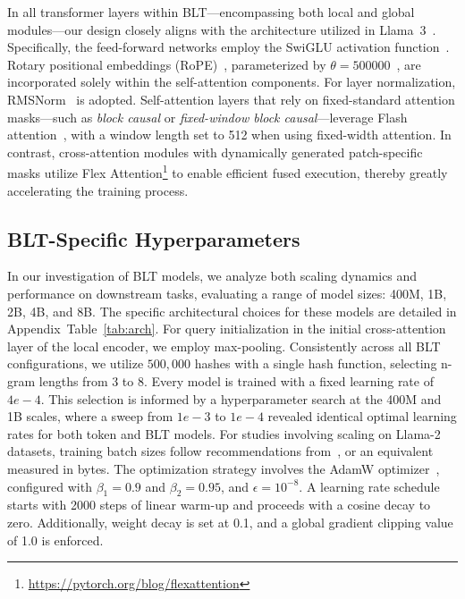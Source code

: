 In all transformer layers within {\textsc BLT}—encompassing both local and global modules—our design closely aligns with the architecture utilized in Llama~3~\citep{dubey2024llama}. Specifically, the feed-forward networks employ the SwiGLU activation function~\citep{swiglu}. Rotary positional embeddings (RoPE)~\citep{RoPe}, parameterized by $\theta=500000$~\citep{xiong2024effective}, are incorporated solely within the self-attention components. For layer normalization, RMSNorm~\citep{RMSNorm} is adopted. Self-attention layers that rely on fixed-standard attention masks—such as \textit{block causal} or \textit{fixed-window block causal}—leverage Flash attention~\citep{dao2022flashattention}, with a window length set to 512 when using fixed-width attention. In contrast, cross-attention modules with dynamically generated patch-specific masks utilize Flex Attention\footnote{\url{https://pytorch.org/blog/flexattention}} to enable efficient fused execution, thereby greatly accelerating the training process.

\subsection{{\textsc BLT}-Specific Hyperparameters} In our investigation of {\textsc BLT} models, we analyze both scaling dynamics and performance on downstream tasks, evaluating a range of model sizes: 400M, 1B, 2B, 4B, and 8B. The specific architectural choices for these models are detailed in Appendix~Table~\ref{tab:arch}. For query initialization in the initial cross-attention layer of the local encoder, we employ max-pooling. Consistently across all {\textsc BLT} configurations, we utilize $500,000$ hashes with a single hash function, selecting n-gram lengths from 3 to 8. Every model is trained with a fixed learning rate of $4e-4$. This selection is informed by a hyperparameter search at the 400M and 1B scales, where a sweep from $1e-3$ to $1e-4$ revealed identical optimal learning rates for both token and {\textsc BLT} models. For studies involving scaling on Llama-2 datasets, training batch sizes follow recommendations from~\cite{dubey2024llama}, or an equivalent measured in bytes. The optimization strategy involves the AdamW optimizer~\citep{adamw}, configured with $\beta_1=0.9$ and $\beta_2=0.95$, and $\epsilon=10^{-8}$. A learning rate schedule starts with 2000 steps of linear warm-up and proceeds with a cosine decay to zero. Additionally, weight decay is set at 0.1, and a global gradient clipping value of 1.0 is enforced.

